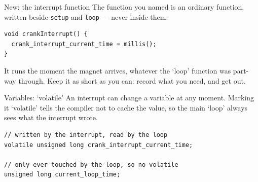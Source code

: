 \documentclass[aspectratio=169]{beamer}
\begin{document}
\begin{frame}[fragile]{New: the interrupt function}
    \normalsize
    The function you named is an ordinary function, written beside \verb|setup| and \verb|loop| --- never inside them:
    \vspace{.5em}
\begin{verbatim}
void crankInterrupt() {
  crank_interrupt_current_time = millis();
}
\end{verbatim}
    \vspace{.5em}
    It runs the moment the magnet arrives, whatever the `loop' function was part-way through. Keep it as short as you can: record what you need, and get out.
\end{frame}

\begin{frame}[fragile]{Variables: `volatile'}
    \Large
    An interrupt can change a variable at any moment. Marking it `volatile' tells the compiler not to cache the value, so the main `loop' always sees what the interrupt wrote.
    \vspace{.75em}
\begin{verbatim}
// written by the interrupt, read by the loop
volatile unsigned long crank_interrupt_current_time;

// only ever touched by the loop, so no volatile
unsigned long current_loop_time;
\end{verbatim}
\end{frame}
\end{document}
